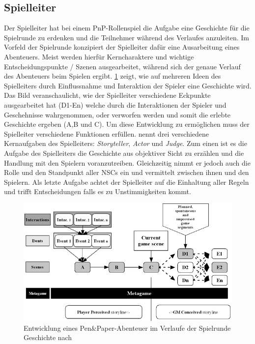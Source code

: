 \subsection{Spielleiter}
\label{sec:Spielleiter}
Der Spielleiter hat bei einem PnP-Rollenspiel die Aufgabe eine Geschichte für die Spielrunde zu erdenken und die Teilnehmer während des Verlaufes anzuleiten. Im Vorfeld der Spielrunde konzipiert der Spielleiter dafür eine Ausarbeitung eines Abenteuers. Meist werden hierfür Kerncharaktere und wichtige Entscheidungspunkte / Szenen ausgearbeitet, während sich der genaue Verlauf des Abenteuers beim Spielen ergibt. \ref{fig:storyflow_pnp} zeigt, wie auf mehreren Ideen des Spielleiters durch Einflussnahme und Interaktion der Spieler eine Geschichte wird. Das Bild veranschaulicht, wie der Spielleiter verschiedene Eckpunkte ausgearbeitet hat (D1-En) welche durch die Interaktionen der Spieler und Geschehnisse wahrgenommen, oder verworfen werden und somit die erlebte Geschichte ergeben (A,B und C). Um diese Entwicklung zu ermöglichen muss der Spielleiter verschiedene Funktionen erfüllen.\newline
\cite{Arinbjarnar} nennt drei verschiedene Kernaufgaben des Spielleiters: \emph{Storyteller}, \emph{Actor} und \emph{Judge}. Zum einen ist es die Aufgabe des Spielleiters die Geschichte aus objektiver Sicht zu erzählen und die Handlung mit den Spielern voranzutreiben. Gleichzeitig nimmt er jedoch auch die Rolle und den Standpunkt aller NSCs ein und vermittelt zwischen ihnen und den Spielern. Als letzte Aufgabe achtet der Spielleiter auf die Einhaltung aller Regeln und trifft Entscheidungen falls es zu Unstimmigkeiten kommt.
\begin{figure}
	\centering
		\includegraphics[width=1.00\textwidth]{media/storyflow_pnp.png}
	\caption{Entwicklung eines Pen\&Paper-Abenteuer im Verlaufe der Spielrunde Geschichte nach \cite{Tychsen2006a}}
	\label{fig:storyflow_pnp}
\end{figure}


